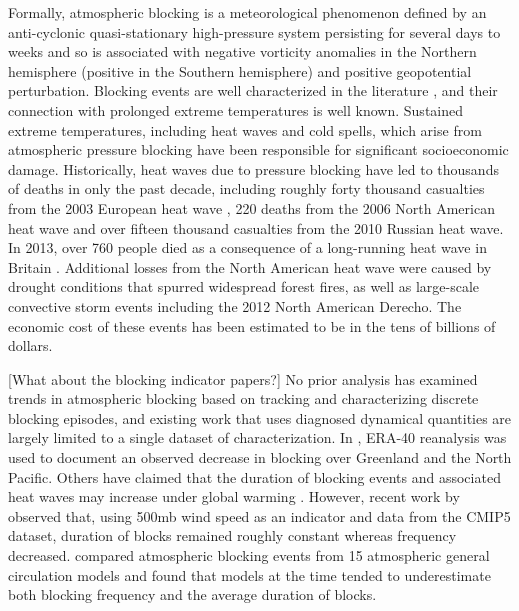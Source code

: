 \documentclass[11pt]{article}
\begin{document}
Formally, atmospheric blocking is a meteorological phenomenon defined by an anti-cyclonic quasi-stationary high-pressure system persisting for several days to weeks and so is associated with negative vorticity anomalies in the Northern hemisphere (positive in the Southern hemisphere) and positive geopotential perturbation.  Blocking events are well characterized in the literature \citep{benzi1986anomalous}, and their connection with prolonged extreme temperatures is well known.  Sustained extreme temperatures, including heat waves and cold spells, which arise from atmospheric pressure blocking have been responsible for significant socioeconomic damage.  Historically, heat waves due to pressure blocking have led to thousands of deaths  in only the past decade, including roughly forty thousand casualties from the 2003 European heat wave \citep{bouchama20042003}, 220 deaths from the 2006 North American heat wave and over fifteen thousand casualties from the 2010 Russian heat wave.  In 2013, over 760 people died as a consequence of a long-running heat wave in Britain \citep{upi2013article}.  Additional losses from the North American heat wave were caused by drought conditions that spurred widespread forest fires, as well as large-scale convective storm events including the 2012 North American Derecho.  The economic cost of these events has been estimated to be in the tens of billions of dollars.

{\color{red}[What about the blocking indicator papers?]}
No prior analysis has examined trends in atmospheric blocking based on tracking and characterizing discrete blocking episodes, and existing work that uses diagnosed dynamical quantities are largely limited to a single dataset of characterization.  In \cite{croci2007multifaceted}, ERA-40 reanalysis was used to document an observed decrease in blocking over Greenland and the North Pacific.  Others have claimed that the duration of blocking events and associated heat waves may increase under global warming \citep{lupo1997climatological, beniston20042003}.  However, recent work by \cite{barnes2012methodology} observed that, using 500mb wind speed as an indicator and data from the CMIP5 dataset, duration of blocks remained roughly constant whereas frequency decreased.  \cite{dandrea1998northern} compared atmospheric blocking events from 15 atmospheric general circulation models and found that models at the time tended to underestimate both blocking frequency and the average duration of blocks.

\end{document}
